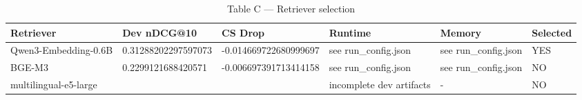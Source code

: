 \begin{table}[ht]
\centering
\caption{Table C — Retriever selection}
\begin{tabular}{llllll}
\hline
Retriever & Dev nDCG@10 & CS Drop & Runtime & Memory & Selected \\
\hline
Qwen3-Embedding-0.6B & 0.31288202297597073 & -0.014669722680999697 & see run\_config.json & see run\_config.json & YES \\
BGE-M3 & 0.2299121688420571 & -0.006697391713414158 & see run\_config.json & see run\_config.json & NO \\
multilingual-e5-large &  &  & incomplete dev artifacts & - & NO \\
\hline
\end{tabular}
\end{table}
